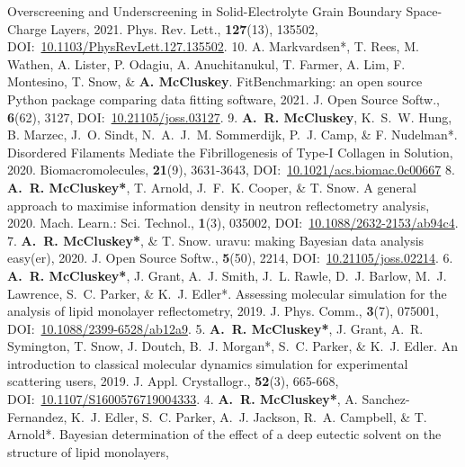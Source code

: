 \begin{cvpubys}
    {Overscreening and Underscreening in Solid-Electrolyte Grain Boundary Space-Charge Layers,}
    {2021.}
    {Phys. Rev. Lett.,}
    {\textbf{127}(13), 135502,}
    {DOI:~\href{https://doi.org/10.1103/PhysRevLett.127.135502}{10.1103/PhysRevLett.127.135502}.}
    {10.}
  \cvpuby
    {A. Markvardsen*, T. Rees, M. Wathen, A. Lister, P. Odagiu, A. Anuchitanukul, T. Farmer, A. Lim, F. Montesino, T. Snow, \& \textbf{A. McCluskey}.}
    {FitBenchmarking: an open source Python package comparing data fitting software,}
    {2021.}
    {J. Open Source Softw.,}
    {\textbf{6}(62), 3127,}
    {DOI:~\href{https://doi.org/10.21105/joss.03127}{10.21105/joss.03127}.}
    {9.}
  \cvpuby
    {\textbf{A.~R. McCluskey}, K.~S.~W. Hung, B. Marzec, J.~O. Sindt, N.~A.~J.~M. Sommerdijk, P.~J. Camp, \& F. Nudelman*.}
    {Disordered Filaments Mediate the Fibrillogenesis of Type-I Collagen in Solution,}
    {2020.}
    {Biomacromolecules,}
    {\textbf{21}(9), 3631-3643,}
    {DOI:~\href{https://doi.org/10.1021/acs.biomac.0c00667}{10.1021/acs.biomac.0c00667}}
    {8.}
  \cvpuby
    {\textbf{A.~R. McCluskey*}, T. Arnold, J.~F.~K. Cooper, \& T. Snow.}
    {A general approach to maximise information density in neutron reflectometry analysis,}
    {2020.}
    {Mach. Learn.: Sci. Technol.,}
    {\textbf{1}(3), 035002,}
    {DOI:~\href{https://doi.org/10.1088/2632-2153/ab94c4}{10.1088/2632-2153/ab94c4}.}
    {7.}
  \cvpuby
    {\textbf{A.~R. McCluskey*}, \& T. Snow.}
    {uravu: making Bayesian data analysis easy(er),}
    {2020.}
    {J. Open Source Softw.,}
    {\textbf{5}(50), 2214,}
    {DOI:~\href{https://doi.org/10.21105/joss.02214}{10.21105/joss.02214}.}
    {6.}
  \cvpuby
    {\textbf{A.~R. McCluskey*}, J. Grant, A.~J. Smith, J.~L. Rawle, D.~J. Barlow, M.~J. Lawrence, S.~C. Parker, \& K.~J. Edler*.}
    {Assessing molecular simulation for the analysis of lipid monolayer reflectometry,}
    {2019.}
    {J. Phys. Comm.,}
    {\textbf{3}(7), 075001,}
    {DOI:~\href{https://doi.org/10.1088/2399-6528/ab12a9}{10.1088/2399-6528/ab12a9}.}
    {5.}
  \cvpuby
    {\textbf{A.~R. McCluskey*}, J. Grant, A.~R. Symington, T. Snow, J. Doutch, B.~J. Morgan*, S.~C. Parker, \& K.~J. Edler.}
    {An introduction to classical molecular dynamics simulation for experimental scattering users,}
    {2019.}
    {J. Appl. Crystallogr.,}
    {\textbf{52}(3), 665-668,}
    {DOI:~\href{https://doi.org/10.1107/S1600576719004333}{10.1107/S1600576719004333}.}
    {4.}
  \cvpuby
    {\textbf{A.~R. McCluskey*}, A. Sanchez-Fernandez, K.~J. Edler, S.~C. Parker, A.~J. Jackson, R.~A. Campbell, \& T. Arnold*.}
    {Bayesian determination of the effect of a deep eutectic solvent on the structure of lipid monolayers,}

\end{cvpubys}
